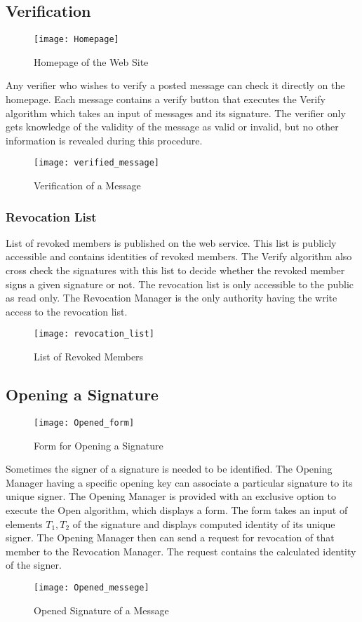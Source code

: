 \subsection{Verification}
\begin{figure}[!h]
    \centering
    \texttt{[image: Homepage]}
    \caption{Homepage of the Web Site}
    \label{fig:Homepage of the Web Site}
\end{figure}
Any verifier who wishes to verify a posted message can check it directly on the homepage. Each message contains a verify button that executes the Verify algorithm which takes an input of messages and its signature. The verifier only gets knowledge of the validity of the message as valid or invalid, but no other information is revealed during this procedure.
\begin{figure}[!h]
    \centering
    \texttt{[image: verified\_message]}
    \caption{Verification of a Message}
    \label{fig:Verification of a Message}
\end{figure}


\subsubsection{Revocation List}
List of revoked members is published on the web service. This list is publicly accessible and contains identities of revoked members. The Verify algorithm also cross check the signatures with this list to decide whether the revoked member signs a given signature or not. The revocation list is only accessible to the public as read only. The Revocation Manager is the only authority having the write access to the revocation list.
\begin{figure}[!h]
    \centering
    \texttt{[image: revocation\_list]}
    \caption{List of Revoked Members}
    \label{fig:List of Revoked Members}
\end{figure}

\subsection{Opening a Signature}
\begin{figure}[!h]
    \centering
    \texttt{[image: Opened\_form]}
    \caption{Form for Opening a Signature}
    \label{fig:Form For Opening a Signature}
\end{figure}
Sometimes the signer of a signature is needed to be identified. The Opening Manager having a specific opening key can associate a particular signature to its unique signer. The Opening Manager is provided with an exclusive option to execute the Open algorithm,  which displays a form. The form takes an input of elements $T_1, T_2$ of the signature and displays computed identity of its unique signer. The Opening Manager then can send a request for revocation of that member to the Revocation Manager. The request contains the calculated identity of the signer.
\begin{figure}[!h]
    \centering
    \texttt{[image: Opened\_messege]}
    \caption{Opened Signature of a Message}
    \label{fig:Opened Signature of a Message}
\end{figure}
